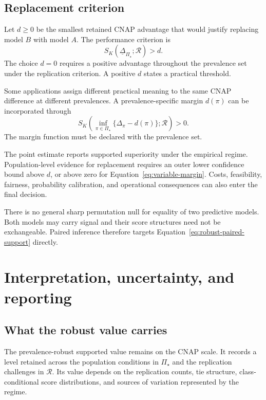 \documentclass[11pt]{article}
\newcommand{\Regime}{\mathcal{R}}
\newcommand{\PSet}{\Pi_\star}
\newcommand{\RobDelta}{\underline{\Delta}_{\PSet}}
\theoremstyle{remark}
\begin{document}
\subsection{Replacement criterion}

Let $d\geq0$ be the smallest retained CNAP advantage that would justify replacing model $B$ with model $A$. The performance criterion is
\begin{equation}
S_K(\RobDelta;\Regime)>d.
\label{eq:replacement}
\end{equation}
The choice $d=0$ requires a positive advantage throughout the prevalence set under the replication criterion. A positive $d$ states a practical threshold.

Some applications assign different practical meaning to the same CNAP difference at different prevalences. A prevalence-specific margin $d(\pi)$ can be incorporated through
\begin{equation}
S_K\left(
\inf_{\pi\in\PSet}
\{\Delta_\pi-d(\pi)\};
\Regime
\right)>0.
\label{eq:variable-margin}
\end{equation}
The margin function must be declared with the prevalence set.

The point estimate reports supported superiority under the empirical regime. Population-level evidence for replacement requires an outer lower confidence bound above $d$, or above zero for Equation~\eqref{eq:variable-margin}. Costs, feasibility, fairness, probability calibration, and operational consequences can also enter the final decision.

There is no general sharp permutation null for equality of two predictive models. Both models may carry signal and their score structures need not be exchangeable. Paired inference therefore targets Equation~\eqref{eq:robust-paired-support} directly.

\section{Interpretation, uncertainty, and reporting}
\label{sec:reporting}

\subsection{What the robust value carries}

The prevalence-robust supported value remains on the CNAP scale. It records a level retained across the population conditions in $\PSet$ and the replication challenges in $\Regime$. Its value depends on the replication counts, tie structure, class-conditional score distributions, and sources of variation represented by the regime.
\end{document}

